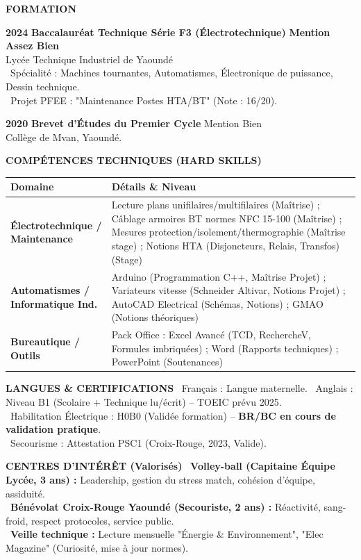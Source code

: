 \documentclass[11pt]{article}
\begin{document}
\begin{exoresolu}
\medskip
\noindent \textbf{FORMATION}

\noindent \textbf{2024} \hfill \textbf{Baccalauréat Technique Série F3 (Électrotechnique)} \hfill \textbf{Mention Assez Bien} \\
Lycée Technique Industriel de Yaoundé \\
\textbullet\ Spécialité : Machines tournantes, Automatismes, Électronique de puissance, Dessin technique. \\
\textbullet\ Projet PFEE : "Maintenance Postes HTA/BT" (Note : 16/20).

\noindent \textbf{2020} \hfill \textbf{Brevet d'Études du Premier Cycle} \hfill Mention Bien \\
Collège de Mvan, Yaoundé.

\medskip
\noindent \textbf{COMPÉTENCES TECHNIQUES (HARD SKILLS)}

\begin{center}
\begin{tabularx}{\linewidth}{|l|X|}
\hline
\rowcolor{popblueL}
\textbf{Domaine} & \textbf{Détails \& Niveau} \\
\hline
\textbf{Électrotechnique / Maintenance} & Lecture plans unifilaires/multifilaires (Maîtrise) ; Câblage armoires BT normes NFC 15-100 (Maîtrise) ; Mesures protection/isolement/thermographie (Maîtrise stage) ; Notions HTA (Disjoncteurs, Relais, Transfos) (Stage) \\
\hline
\textbf{Automatismes / Informatique Ind.} & Arduino (Programmation C++, Maîtrise Projet) ; Variateurs vitesse (Schneider Altivar, Notions Projet) ; AutoCAD Electrical (Schémas, Notions) ; GMAO (Notions théoriques) \\
\hline
\textbf{Bureautique / Outils} & Pack Office : Excel Avancé (TCD, RechercheV, Formules imbriquées) ; Word (Rapports techniques) ; PowerPoint (Soutenances) \\
\hline
\end{tabularx}
\end{center}

\medskip
\noindent \textbf{LANGUES \& CERTIFICATIONS}
\textbullet\ Français : Langue maternelle. \quad \textbullet\ Anglais : Niveau B1 (Scolaire + Technique lu/écrit) -- TOEIC prévu 2025. \\
\textbullet\ Habilitation Électrique : H0B0 (Validée formation) -- \textbf{BR/BC en cours de validation pratique}. \\
\textbullet\ Secourisme : Attestation PSC1 (Croix-Rouge, 2023, Valide).

\medskip
\noindent \textbf{CENTRES D'INTÉRÊT (Valorisés)}
\textbullet\ \textbf{Volley-ball (Capitaine Équipe Lycée, 3 ans) :} Leadership, gestion du stress match, cohésion d'équipe, assiduité. \\
\textbullet\ \textbf{Bénévolat Croix-Rouge Yaoundé (Secouriste, 2 ans) :} Réactivité, sang-froid, respect protocoles, service public. \\
\textbullet\ \textbf{Veille technique :} Lecture mensuelle "Énergie \& Environnement", "Elec Magazine" (Curiosité, mise à jour normes).


\end{exoresolu}
\end{document}

